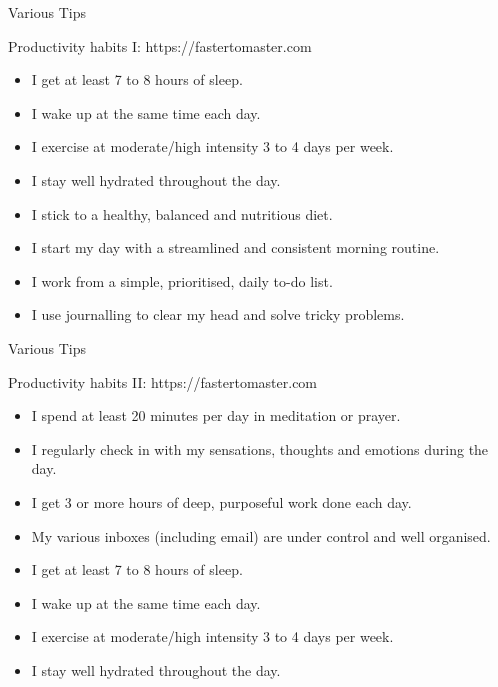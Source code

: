 \begin{frame}{Various Tips}
  \begin{block}{Productivity habits I: https://fastertomaster.com}
    \begin{itemize}
      \item I get at least 7 to 8 hours of sleep.
      \item I wake up at the same time each day.
      \item I exercise at moderate/high intensity 3 to 4 days per week.
      \item I stay well hydrated throughout the day.
      \item I stick to a healthy, balanced and nutritious diet.
      \item I start my day with a streamlined and consistent morning routine.
      \item I work from a simple, prioritised, daily to-do list.
      \item I use journalling to clear my head and solve tricky problems.
    \end{itemize}
  \end{block}
\end{frame}

\begin{frame}{Various Tips}
  \begin{block}{Productivity habits II: https://fastertomaster.com}
    \begin{itemize}
      \item I spend at least 20 minutes per day in meditation or prayer.
      \item I regularly check in with my sensations, thoughts and emotions during the day.
      \item I get 3 or more hours of deep, purposeful work done each day.
      \item My various inboxes (including email) are under control and well organised.
      \item I get at least 7 to 8 hours of sleep.
      \item I wake up at the same time each day.
      \item I exercise at moderate/high intensity 3 to 4 days per week.
      \item I stay well hydrated throughout the day.
    \end{itemize}
  \end{block}
\end{frame}

